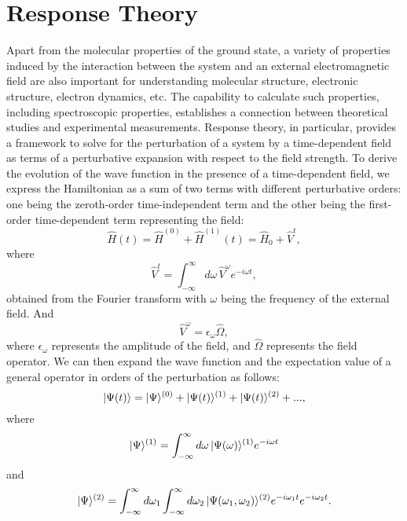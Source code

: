 \section{Response Theory}\label{response}
Apart from the molecular properties of the ground state, a variety of properties induced by the interaction between the system and an external electromagnetic field are also important for understanding molecular structure, electronic structure, electron dynamics, etc.\cite{English2015, Stuyver2020} The capability to calculate such properties, including spectroscopic properties, establishes a connection between theoretical studies and experimental measurements. Response theory, in particular, provides a framework to solve for the perturbation of a system by a time-dependent field as terms of a perturbative expansion with respect to the field strength.\cite{Norman2011, Helgaker2012} To derive the evolution of the wave function in the presence of a time-dependent field, we express the Hamiltonian as a sum of two terms with different perturbative orders: one being the zeroth-order time-independent term and the other being the first-order time-dependent term representing the field:
\begin{equation}
\hat{H}(t) = \hat{H}^{(0)} +  \hat{H}^{(1)}(t) = \hat{H}_{0} + \hat{V}^{t},
\label{eq:response-h}
\end{equation}
where
\begin{equation}
\hat{V}^{t} = \int_{-\infty}^{\infty} d\omega \, \hat{V}^{\omega}e^{-i\omega t},
\label{eq:response-V}
\end{equation}
obtained from the Fourier transform\cite{Bracewell1989} with $\omega$ being the frequency of the external field. And
\begin{equation}
\hat{V}^{\omega} = \epsilon_{\omega}\hat{\Omega},
\end{equation}
where $\epsilon_{\omega}$ represents the amplitude of the field, and $\hat{\Omega}$ represents the field operator. We can then expand the wave function and the expectation value of a general operator in orders of the perturbation as follows: 
\begin{equation}
| \Psi(t) \rangle = | \Psi \rangle^{(0)} +  | \Psi(t) \rangle^{(1)} +  | \Psi(t) \rangle^{(2)} + ...,
\end{equation}
where 
\begin{equation}
| \Psi \rangle^{(1)} = \int_{-\infty}^{\infty} d\omega \,  | \Psi(\omega) \rangle^{(1)}e^{-i\omega t}
\end{equation}
and
\begin{equation}
| \Psi \rangle^{(2)}  = \int_{-\infty}^{\infty} d\omega_{1} \int_{-\infty}^{\infty} d\omega_{2} \, 
                            | \Psi(\omega_{1}, \omega_{2}) \rangle^{(2)}e^{-i\omega_{1} t}e^{-i\omega_{2} t}.
\end{equation}
